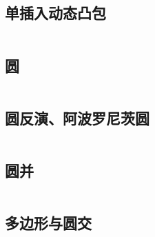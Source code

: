 \documentclass[titlepage, a4paper, 11pt]{article}
\begin{document}
\begin{spacing}{1.15}
				\subsection{单插入动态凸包}
				\inputminted{cpp}{src/Geometry/dynamic_convex_hull.cpp}
				
				
				\subsection{圆}
					\inputminted[highlightlines={7}]{cpp}{src/Geometry/circle.cpp}
				\subsection{圆反演、阿波罗尼茨圆}
				\begin{small}
					
				\end{small}
					\inputminted{cpp}{src/yzh/circle_inversion.cpp}
				\subsection{圆并}
					\inputminted{cpp}{src/Geometry/圆并.cpp}
				\subsection{多边形与圆交}
					\inputminted{cpp}{src/Geometry/多边形和圆的交.cpp}
				

\end{spacing}
\end{document}
